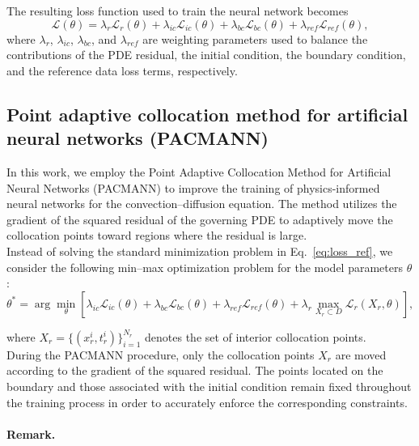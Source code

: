 \documentclass[10pt,reqno]{article}
\numberwithin{equation}{section}
\begin{document}
The resulting loss function used to train the neural network becomes
\begin{equation}
\mathcal{L}(\theta)
=
\lambda_r \mathcal{L}_r(\theta)
+
\lambda_{ic} \mathcal{L}_{ic}(\theta)
+
\lambda_{bc} \mathcal{L}_{bc}(\theta)
+
\lambda_{ref} \mathcal{L}_{ref}(\theta),
\label{eq:loss_ref}
\end{equation}
where $\lambda_r$, $\lambda_{ic}$, $\lambda_{bc}$, and $\lambda_{ref}$ are weighting parameters used to balance the contributions of the PDE residual, the initial condition, the boundary condition, and the reference data loss terms, respectively.

\subsection{Point adaptive collocation method for artificial neural networks (PACMANN)}

In this work, we employ the Point Adaptive Collocation Method for Artificial Neural Networks (PACMANN) to improve the training of physics-informed neural networks for the convection--diffusion equation. The method utilizes the gradient of the squared residual of the governing PDE to adaptively move the collocation points toward regions where the residual is large.\\
Instead of solving the standard minimization problem in Eq.~\eqref{eq:loss_ref}, we consider the following min--max optimization problem for the model parameters $\theta$:
\begin{equation}
\theta^*
=
\arg\min_{\theta}
\left[
\lambda_{ic}\mathcal{L}_{ic}(\theta)
+
\lambda_{bc}\mathcal{L}_{bc}(\theta)
+
\lambda_{ref}\mathcal{L}_{ref}(\theta)
+
\lambda_r
\max_{X_r \subset D}
\mathcal{L}_r(X_r,\theta)
\right],
\label{eq:pacmann_cd}
\end{equation}

where
$
X_r = \{(x_r^i,t_r^i)\}_{i=1}^{N_r}
$
denotes the set of interior collocation points.\\
During the PACMANN procedure, only the collocation points $X_r$ are moved according to the gradient of the squared residual. The points located on the boundary and those associated with the initial condition remain fixed throughout the training process in order to accurately enforce the corresponding constraints.

\paragraph{Remark.}
\end{document}
